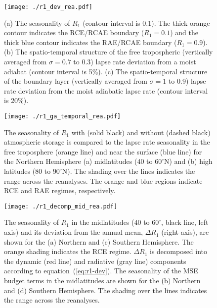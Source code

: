 \documentclass{ametsocV5}
\begin{document}
\begin{figure}[t]
  \centering
  \noindent\texttt{[image: ./r1\_dev\_rea.pdf]}\\
  \caption{(a) The seasonality of $R_{1}$ (contour interval is 0.1). The thick orange contour indicates the RCE/RCAE boundary ($R_1=0.1$) and the thick blue contour indicates the RAE/RCAE boundary ($R_1 = 0.9$). (b) The spatio-temporal structure of the free tropospheric (vertically averaged from $\sigma=0.7$ to 0.3) lapse rate deviation from a moist adiabat (contour interval is 5\%). (c) The spatio-temporal structure of the boundary layer (vertically averaged from $\sigma=1$ to 0.9) lapse rate deviation from the moist adiabatic lapse rate (contour interval is 20\%).}
  \label{fig:rea-r1-dev}
\end{figure}

\begin{figure}[t]
  \noindent\texttt{[image: ./r1\_ga\_temporal\_rea.pdf]}\\
  \caption{The seasonality of $R_1$ with (solid black) and without (dashed black) atmospheric storage is compared to the lapse rate seasonality in the free troposphere (orange line) and near the surface (blue line) for the Northern Hemisphere (a) midlatitudes ($40$ to $60^\circ$N) and (b) high latitudes ($80$ to $90^\circ$N). The shading over the lines indicates the range across the reanalyses. The orange and blue regions indicate RCE and RAE regimes, respectively.}
  \label{fig:rea-r1-ga-temporal}
\end{figure}

\begin{figure}[t]
  \noindent\texttt{[image: ./r1\_decomp\_mid\_rea.pdf]}\\
  \caption{The seasonality of $R_{1}$ in the midlatitudes ($40$ to $60^{\circ}$, black line, left axis) and its deviation from the annual mean, $\Delta R_1$ (right axis), are shown for the (a) Northern and (c) Southern Hemisphere. The orange shading indicates the RCE regime. $\Delta R_1$ is decomposed into the dynamic (red line) and radiative (gray line) components according to equation~(\ref{eq:r1-dev}). The seasonality of the MSE budget terms in the midlatitudes are shown for the (b) Northern and (d) Southern Hemisphere. The shading over the lines indicates the range across the reanalyses.}
  \label{fig:rea-r1-decomp-mid}
\end{figure}
\end{document}
